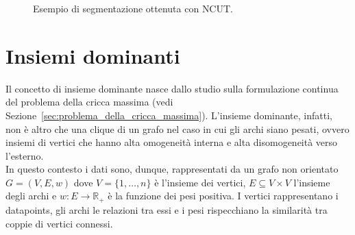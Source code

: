\begin{figure}[h!]
	\centering
	\caption{Esempio di segmentazione ottenuta con NCUT.}
\end{figure}



\newpage


\section{Insiemi dominanti} %

Il concetto di insieme dominante nasce dallo studio sulla formulazione continua del problema della cricca massima (vedi Sezione~\ref{sec:problema_della_cricca_massima}). L'insieme dominante, infatti, non è altro che una clique di un grafo nel caso in cui gli archi siano pesati, ovvero insiemi di vertici che hanno alta omogeneità interna e alta disomogeneità verso l'esterno.\\

In questo contesto i dati sono, dunque, rappresentati da un grafo non orientato $G = (V, E , w)$ dove $V = \{ 1, \dots, n \}$ è l'insieme dei vertici, $E\subseteq V \times V$ l'insieme degli archi e $w : E \rightarrow \mathbb{R}_+$ è la funzione dei pesi positiva. I vertici rappresentano i datapoints, gli archi le relazioni tra essi e i pesi rispecchiano la similarità tra coppie di vertici connessi.\\

